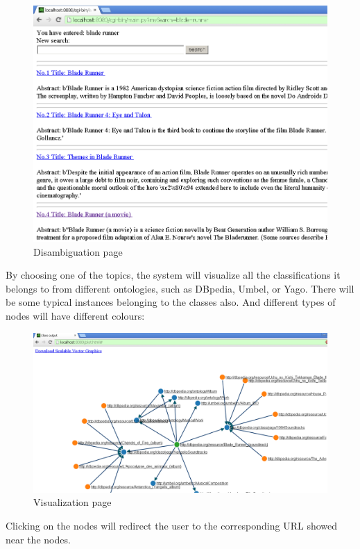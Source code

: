 \documentclass[12pt]{cls}
\begin{document}
\begin{figure}[H]
\centering
\includegraphics[width=\textwidth]{figures/page2.png}
\caption{Disambiguation page}
\label{Disambiguating page}
\end{figure}

By choosing one of the topics, the system will visualize all the classifications it belongs to from different ontologies, such as DBpedia, Umbel, or Yago. There will be some typical instances belonging to the classes also. And different types of nodes will have different colours:

\begin{figure}[H]
\centering
\includegraphics[width=\textwidth]{figures/page3.png}
\caption{Visualization page}
\label{Visualization page}
\end{figure}

Clicking on the nodes will redirect the user to the corresponding URL showed near the nodes.
\end{document}

